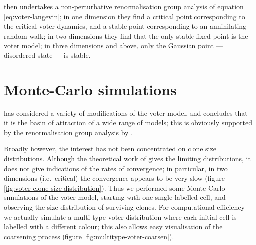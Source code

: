 \documentclass[10pt,english]{report}
\begin{document}
\citet{canet05} then undertakes a non-perturbative renormalisation group analysis of equation \eqref{eq:voter-langevin}; in one dimension they find a critical point corresponding to the critical voter dynamics, and a stable point corresponding to an annihilating random walk; in two dimensions they find that the only stable fixed point is the voter model; in three dimensions and above, only the Gaussian point --- disordered state --- is stable.
 
\section{Monte-Carlo simulations}

\citet{dornic01} has considered a variety of modifications of the voter model, and concludes that it is the basin of attraction of a wide range of models; this is obviously supported by the renormalisation group analysis by \citet{canet05}.

Broadly however, the interest has not been concentrated on clone size distributions. Although the theoretical work of \citet{bramson&griffeath} gives the limiting distributions, it does not give indications of the rates of convergence; in particular, in two dimensions (i.e.\ critical) the convergence appears to be very slow (figure \ref{fig:voter-clone-size-distribution}). Thus we performed some Monte-Carlo simulations of the voter model, starting with one single labelled cell, and observing the size distribution of surviving clones. For computational efficiency we actually simulate a multi-type voter distribution where each initial cell is labelled with a different colour; this also allows easy visualisation of the coarsening process (figure \ref{fig:multitype-voter-coarsen}).
\end{document}
